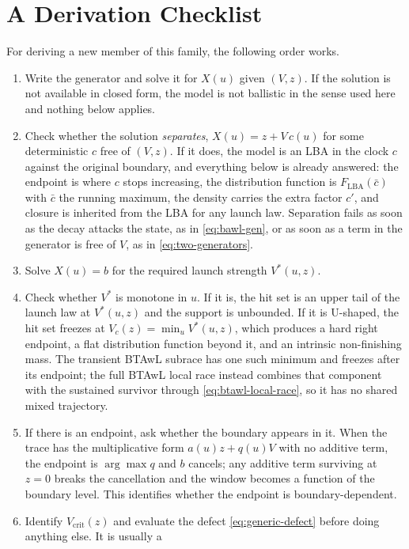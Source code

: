\documentclass[12pt]{article}
\theoremstyle{remark}
\begin{document}
\section{A Derivation Checklist}
\label{sec:checklist}
For deriving a new member of this family, the following order works.
\begin{enumerate}
  \item Write the generator and solve it for $X(u)$ given $(V,z)$. If the solution is not available in closed form, the model is not ballistic in the sense used here and nothing below applies.
  \item Check whether the solution \emph{separates}, $X(u) = z + V\,c(u)$ for some deterministic $c$ free of $(V,z)$. If it does, the model is an LBA in the clock $c$ against the original boundary, and everything below is already answered: the endpoint is where $c$ stops increasing, the distribution function is $F_{\mathrm{LBA}}(\bar c)$ with $\bar c$ the running maximum, the density carries the extra factor $c'$, and closure is inherited from the LBA for any launch law. Separation fails as soon as the decay attacks the state, as in \eqref{eq:bawl-gen}, or as soon as a term in the generator is free of $V$, as in \eqref{eq:two-generators}.
  \item Solve $X(u) = b$ for the required launch strength $V^{*}(u,z)$.
  \item Check whether $V^{*}$ is monotone in $u$. If it is, the hit set is an upper tail of the launch law at $V^{*}(u,z)$ and the support is unbounded. If it is U-shaped, the hit set freezes at $V_c(z) = \min_u V^{*}(u,z)$, which produces a hard right endpoint, a flat distribution function beyond it, and an intrinsic non-finishing mass.  The transient BTAwL subrace has one such minimum and freezes after its endpoint; the full BTAwL local race instead combines that component with the sustained survivor through
        \eqref{eq:btawl-local-race}, so it has no shared mixed trajectory.
  \item If there is an endpoint, ask whether the boundary appears in it. When the trace has the multiplicative form $a(u)z+q(u)V$ with no additive term, the endpoint is $\arg\max q$ and $b$ cancels; any additive term surviving at $z=0$ breaks the cancellation and the window becomes a function of the boundary level. This identifies whether the endpoint is boundary-dependent.
  \item Identify $V_{\mathrm{crit}}(z)$ and evaluate the defect
        \eqref{eq:generic-defect} before doing anything else. It is usually a

\end{enumerate}
\end{document}
